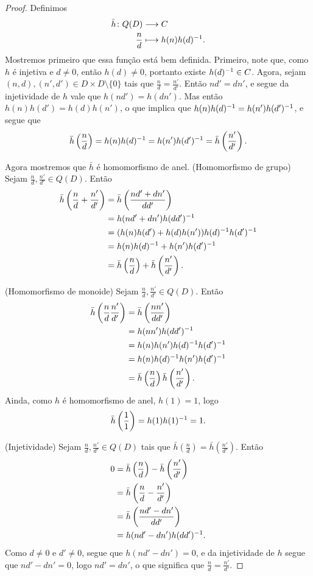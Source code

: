 \begin{proof}
Definimos
	\begin{align*}
	{\bar h}\colon {Q(D)} &\longrightarrow {C} \\{\frac{n}{d}} &\longmapsto h(n)h(d)^{-1}.
	\end{align*}
Mostremos primeiro que essa função está bem definida. Primeiro, note que, como $h$ é injetiva e $d \neq 0$, então $h(d) \neq 0$, portanto existe $h(d)^{-1} \in C$. Agora, sejam $(n,d),(n',d') \in D \times D \setminus \{0\}$ tais que $\frac{n}{d} = \frac{n'}{d'}$. Então $nd'=dn'$, e segue da injetividade de $h$ vale que $h(nd') = h(dn')$. Mas então $h(n)h(d')=h(d)h(n')$, o que implica que $h(n)h(d)^{-1} = h(n')h(d')^{-1}$, e segue que
	\begin{equation*}
	\bar h\left( \frac{n}{d} \right) = h(n)h(d)^{-1} = h(n')h(d')^{-1} = \bar h\left( \frac{n'}{d'} \right).
	\end{equation*}

Agora mostremos que $\bar h$ é homomorfismo de anel. (Homomorfismo de grupo) Sejam $\frac{n}{d},\frac{n'}{d'} \in Q(D)$. Então
	\begin{align*}
	\bar h\left( \frac{n}{d} + \frac{n'}{d'} \right) &= \bar h\left( \frac{nd'+dn'}{dd'} \right) \\
		&= h(nd'+dn')h(dd')^{-1} \\
		&= (h(n)h(d')+h(d)h(n'))h(d)^{-1} h(d')^{-1} \\
		&= h(n)h(d)^{-1} + h(n')h(d')^{-1} \\
		&= \bar h\left( \frac{n}{d} \right) + \bar h \left( \frac{n'}{d'} \right).
	\end{align*}

(Homomorfismo de monoide) Sejam $\frac{n}{d},\frac{n'}{d'} \in Q(D)$. Então
	\begin{align*}
	\bar h\left( \frac{n}{d}\frac{n'}{d'} \right) &= \bar h\left( \frac{nn'}{dd'} \right) \\
		&= h(nn')h(dd')^{-1} \\
		&= h(n)h(n')h(d)^{-1} h(d')^{-1} \\
		&= h(n)h(d)^{-1} h(n')h(d')^{-1} \\
		&= \bar h\left( \frac{n}{d} \right)\bar h \left( \frac{n'}{d'} \right).
	\end{align*}
Ainda, como $h$ é homomorfismo de anel, $h(1)=1$, logo
	\begin{equation*}
	\bar h\left( \frac{1}{1} \right) = h(1)h(1)^{-1} = 1.
	\end{equation*}

(Injetividade) Sejam $\frac{n}{d},\frac{n'}{d'} \in Q(D)$ tais que $\bar h(\frac{n}{d}) = \bar h(\frac{n'}{d'})$. Então
	\begin{align*}
	0 &= \bar h \left( \frac{n}{d} \right) - \bar h \left( \frac{n'}{d'} \right) \\
		&= \bar h \left( \frac{n}{d} - \frac{n'}{d'} \right) \\
		&= \bar h \left( \frac{nd'-dn'}{dd'} \right) \\
		&= h(nd'-dn')h(dd')^{-1}.
	\end{align*}
Como $d \neq 0$ e $d' \neq 0$, segue que $h(nd'-dn')=0$, e da injetividade de $h$ segue que $nd'-dn'=0$, logo $nd'=dn'$, o que significa que $\frac{n}{d} = \frac{n'}{d'}$.


\end{proof}
